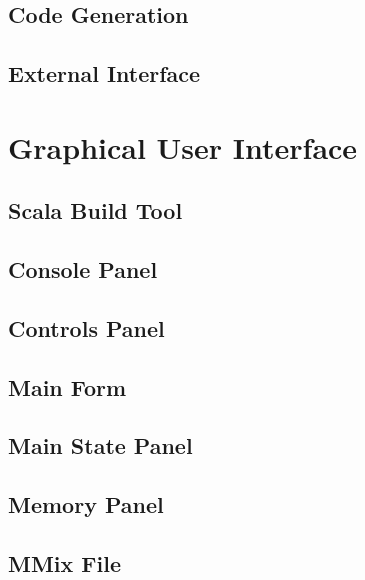\documentclass[a4paper,11pt]{report}
\begin{document}
\begin{appendices}
\subsection{Code Generation}\label{source:codegen}

\subsection{External Interface}\label{source:main}

\section{Graphical User Interface}
\subsection{Scala Build Tool}\label{source:sbt}

\subsection{Console Panel}\label{source:console_panel}

\subsection{Controls Panel}\label{source:controls_panel}

\subsection{Main Form}\label{source:main_form}

\subsection{Main State Panel}\label{source:main_state_panel}

\subsection{Memory Panel}\label{source:memory_panel}

\subsection{MMix File}\label{source:mmix_file}


\end{appendices}
\end{document}
